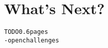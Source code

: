 \section{What's Next?}\label{sec:whatsnext}

\begin{alltt}TODO\scriptsize 0.6 pages
- open challenges
\end{alltt}
